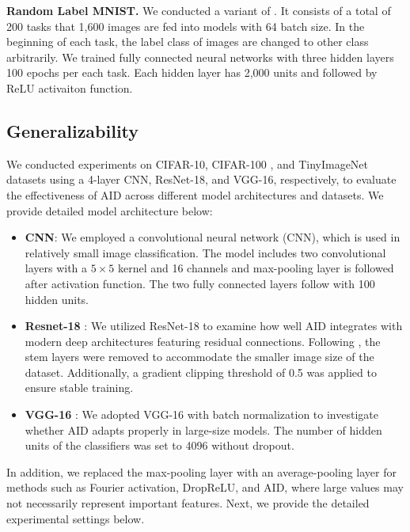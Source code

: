 \textbf{Random Label MNIST. }
We conducted a variant of \cite{kumar2023maintaining}.
It consists of a total of 200 tasks that 1,600 images are fed into models with 64 batch size.
In the beginning of each task, the label class of images are changed to other class arbitrarily.
We trained fully connected neural networks with three hidden layers 100 epochs per each task.
Each hidden layer has 2,000 units and followed by ReLU activaiton function.


\subsection{Generalizability}
\label{app:generalizability}
We conducted experiments on CIFAR-10, CIFAR-100 \cite{krizhevsky2009learning}, and TinyImageNet \cite{le2015tiny} datasets using a 4-layer CNN, ResNet-18, and VGG-16, respectively, to evaluate the effectiveness of AID across different model architectures and datasets.
We provide detailed model architecture below:
\begin{itemize}
    \item \textbf{CNN}: We employed a convolutional neural network (CNN), which is used in relatively small image classification.
    The model includes two convolutional layers with a $5\times5$ kernel and 16 channels and max-pooling layer is followed after activation function.
    The two fully connected layers follow with 100 hidden units. 
    \item \textbf{Resnet-18} \citep{he2016deep}: We utilized ResNet-18 to examine how well AID integrates with modern deep architectures featuring residual connections.
    Following \cite{lee2024slow}, the stem layers were removed to accommodate the smaller image size of the dataset. Additionally, a gradient clipping threshold of 0.5 was applied to ensure stable training.
    \item \textbf{VGG-16} \citep{simonyan2014very}: We adopted VGG-16 with batch normalization to investigate whether AID adapts properly in large-size models. The number of hidden units of the classifiers was set to 4096 without dropout.
\end{itemize}

In addition, we replaced the max-pooling layer with an average-pooling layer for methods such as Fourier activation, DropReLU, and AID, where large values may not necessarily represent important features.
Next, we provide the detailed experimental settings below.

